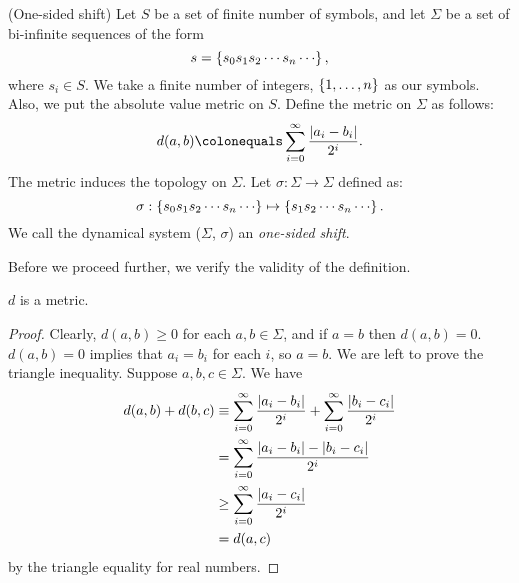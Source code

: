 \documentclass[10pt,twoside]{book}
\begin{document}
\begin{definition}
  (One-sided shift)
  Let $S$ be a set of finite number of symbols, and let $\Sigma$ be a set of bi-infinite sequences of the form
  \begin{equation*}
    s = \set{ s_0 s_1 s_2 \cdots s_n \cdots },
  \end{equation*}
  where $s_i \in S$.
  We take a finite number of integers, $\left \{ 1, \ldots, n \right \}$ as our symbols.
  Also, we put the absolute value metric on $S$.
  Define the metric on $\Sigma$ as follows:
  \begin{equation*}
    d(a,b) \ceq \sum\limits_{i = 0}^{\infty} \frac{\abs{a_i - b_i}}{2^i}.
  \end{equation*}
  The metric induces the topology on $\Sigma$.
  Let $\sigma: \Sigma \to \Sigma$ defined as:
  \begin{equation*}
    \sigma: \set{ s_0 s_1 s_2 \cdots s_n \cdots } 
    \mapsto 
    \set{ s_1 s_2 \cdots s_n \cdots }.
  \end{equation*}
  We call the dynamical system ($\Sigma$, $\sigma$) an \textit{one-sided shift}.
\end{definition}
Before we proceed further, we verify the validity of the definition.
\begin{proposition}
  $d$ is a metric.
  \label{prop:symb-metric}
  \begin{proof}
    Clearly, $d(a,b) \geq 0$ for each $a,b \in \Sigma$, and if $a = b$ then $d(a,b) = 0$.
    $d(a,b) = 0$ implies that $a_i = b_i$ for each $i$, so $a = b$.
    We are left to prove the triangle inequality.
    Suppose $a,b,c \in \Sigma$.
    We have
    \begin{align*}
      d(a,b) + d(b,c)
      &\equiv \sum\limits_{i = 0}^{\infty} \frac{\left | a_i - b_i \right |}{2^i}  +  \sum\limits_{i = 0}^{\infty} \frac{\left | b_i - c_i \right |}{2^i}  \\
      &= \sum\limits_{i = 0}^{\infty} \frac{\left | a_i - b_i \right | - \left | b_i - c_i \right |}{2^i}  \\
      &\geq \sum\limits_{i = 0}^{\infty} \frac{\left | a_i - c_i \right |}{2^i}  \\
      &= d(a,c)
    \end{align*}
    by the triangle equality for real numbers.
  \end{proof}
\end{proposition}
\end{document}
